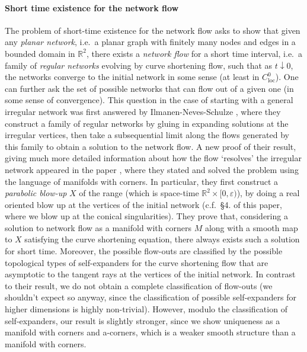 \documentclass[10pt, a4paper]{article}
\theoremstyle{plain}%
\theoremstyle{definition}
\numberwithin{figure}{section}
\numberwithin{equation}{section}
\newcommand{\bR}{\mathbb{R}}
\newcommand{\ep}{\varepsilon}
\begin{document}
\paragraph*{\textbf{Short time existence for the network flow}} The problem of short-time existence for the network flow asks to show that given any \textit{planar network}, i.e.\ a planar graph with finitely many nodes and edges in a bounded domain in $\bR^2$, there exists a \textit{network flow} for a short time interval, i.e.\ a family of \textit{regular networks} evolving by curve shortening flow, such that as $t\downarrow 0$, the networks converge to the initial network in some sense (at least in $C^0_\mathrm{loc}$). One can further ask the set of possible networks that can flow out of a given one (in some sense of convergence). This question in the case of starting with a general irregular network was first answered by Ilmanen-Neves-Schulze \cite{INS19}, where they construct a family of regular networks by gluing in expanding solutions at the irregular vertices, then take a subsequential limit along the flows generated by this family to obtain a solution to the network flow. A new proof of their result, giving much more detailed information about how the flow `resolves' the irregular network appeared in the paper \cite{LMPS23}, where they stated and solved the problem using the language of manifolds with corners. In particular, they first construct a \textit{parabolic blow-up} $X$ of the range (which is space-time $\bR^2\times [0,\ep)$), by doing a real oriented blow up at the vertices of the initial network (c.f.\ \S 4. of this paper, where we blow up at the conical singularities).
They prove that, considering a solution to network flow as a manifold with corners $M$ along with a smooth map to $X$ satisfying the curve shortening equation, there always exists such a solution for short time. Moreover, the possible flow-outs are classified by the possible topological types of self-expanders for the curve shortening flow that are asymptotic to the tangent rays at the vertices of the initial network. In contrast to their result, we do not obtain a complete classification of flow-outs (we shouldn't expect so anyway, since the classification of possible self-expanders for higher dimensions is highly non-trivial). However, modulo the classification of self-expanders, our result is slightly stronger, since we show uniqueness as a manifold with corners and a-corners, which is a weaker smooth structure than a manifold with corners. 
\end{document}

